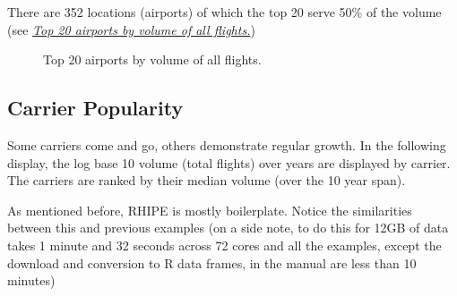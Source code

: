 \documentclass[letterpaper,10pt,english]{sphinxmanual}
\begin{document}
There are 352 locations (airports) of which the top 20 serve 50\% of the volume
(see \hyperref[airline:figvolume]{\emph{Top 20 airports by volume of all flights.}})
\label{airline:figvolume}\begin{figure}[htbp]
\centering

\caption{Top 20 airports by volume of all flights.}\end{figure}


\subsection{Carrier Popularity}
\label{airline:carrier-popularity}
Some carriers come and go, others demonstrate regular growth. In the following
display, the log base 10 volume (total flights) over years are displayed by
carrier. The carriers are ranked by their median volume (over the 10 year
span).

As mentioned before, RHIPE is mostly boilerplate. Notice the similarities
between this and previous examples (on a side note, to do this for 12GB of data
takes 1 minute and 32 seconds across 72 cores and all the examples, except the
download and conversion to R data frames, in the manual are less than 10 minutes)
\end{document}
